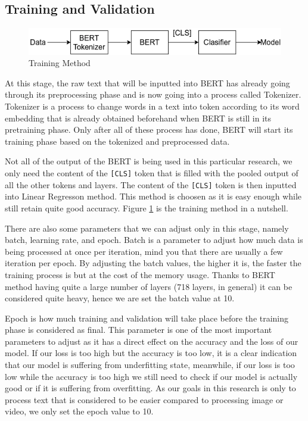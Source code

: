 \subsection{Training and Validation}

\begin{figure}[h!]
    \begin{center}
        \includegraphics[width= 0.9\linewidth]{gambar/training.png}
        \caption{Training Method}
        \label{fig: metodologi_training}
    \end{center}
\end{figure}

At this stage, the raw text that will be inputted into BERT has already going through its preprocessing phase and is now going into a process called Tokenizer. Tokenizer is a process to change words in a text into token according to its word embedding that is already obtained beforehand when BERT is still in its pretraining phase. Only after all of these process has done, BERT will start its training phase based on the tokenized and preprocessed data.

Not all of the output of the BERT is being used in this particular research, we only need the content of the \texttt{[CLS]} token that is filled with the pooled output of all the other tokens and layers. The content of the \texttt{[CLS]} token is then inputted into Linear Regresson method. This method is choosen as it is easy enough while still retain quite good accuracy. Figure \ref{fig: metodologi_training} is the training method in a nutshell.

There are also some parameters that we can adjust only in this stage, namely batch, learning rate, and epoch. Batch is a parameter to adjust how much data is being processed at once per iteration, mind you that there are usually a few iteration per epoch. By adjusting the batch values, the higher it is, the faster the training process is but at the cost of the memory usage. Thanks to BERT method having quite a large number of layers (718 layers, in general) it can be considered quite heavy, hence we are set the batch value at 10.

Epoch is how much training and validation will take place before the training phase is considered as final. This parameter is one of the most important parameters to adjust as it has a direct effect on the accuracy and the loss of our model. If our loss is too high but the accuracy is too low, it is a clear indication that our model is suffering from underfitting state, meanwhile, if our loss is too low while the accuracy is too high we still need to check if our model is actually good or if it is suffering from overfitting. As our goals in this research is only to process text that is considered to be easier compared to processing image or video, we only set the epoch value to 10.

